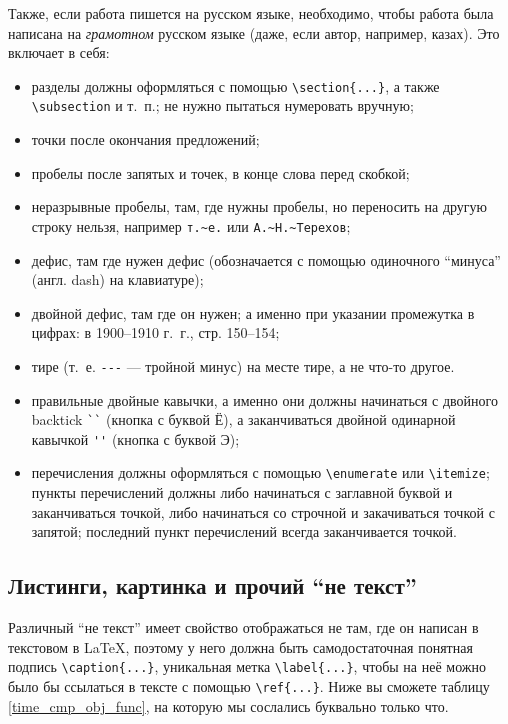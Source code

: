 Также, если работа пишется на русском языке, необходимо, чтобы работа была написана на \textit{грамотном} русском языке (даже, если автор, например, казах). Это включает в себя:
\begin{itemize}
  \item разделы должны оформляться с помощью \verb=\section{...}=, а также \verb=\subsection= и т.~п.; не нужно пытаться нумеровать вручную;
  \item точки после окончания предложений;
  \item пробелы после запятых  и точек, в конце слова перед скобкой;
  \item неразрывные пробелы, там, где нужны пробелы, но переносить на другую строку нельзя, например \verb=т.~е.= или \verb=А.~Н.~Терехов=;
  \item дефис, там где нужен дефис (обозначается с помощью одиночного ``минуса'' (англ. dash) на клавиатуре);
  \item двойной дефис, там где он нужен; а именно  при указании промежутка в цифрах: в 1900--1910 г.~г., стр. 150--154;
  \item тире (т.~е. \verb=---= --- тройной минус) на месте тире, а не что-то другое.
  \item правильные двойные кавычки, а именно они должны начинаться с двойного backtick \verb=``= (кнопка с буквой Ё), а заканчиваться двойной одинарной кавычкой \verb=''= (кнопка с буквой Э);
  \item перечисления должны оформляться с помощью \verb=\enumerate= или \verb=\itemize=; пункты перечислений должны либо начинаться с заглавной буквой и заканчиваться точкой, либо начинаться со строчной и закачиваться точкой с запятой; последний пункт перечислений всегда заканчивается точкой.
\end{itemize}



\subsection{Листинги, картинка и прочий ``не текст''}

Различный ``не текст'' имеет свойство отображаться не там, где он написан в текстовом в \LaTeX{}, поэтому у него должна быть самодостаточная понятная подпись \verb=\caption{...}=, уникальная метка \verb=\label{...}=, чтобы на неё можно было бы ссылаться в тексте с помощью \verb=\ref{...}=. Ниже вы сможете таблицу \ref{time_cmp_obj_func}, на которую мы сослались буквально только что.


